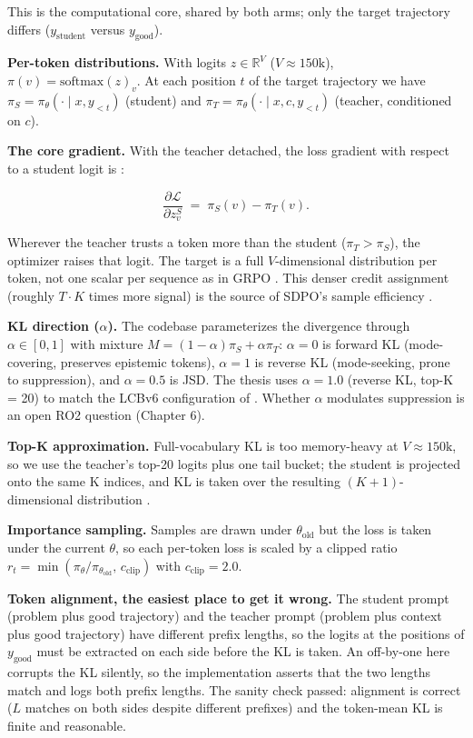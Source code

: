 \documentclass[12pt,a4paper]{report}
\begin{document}
This is the computational core, shared by both arms; only the target trajectory differs (\(y_{\text{student}}\) versus \(y_{\text{good}}\)).

\textbf{Per-token distributions.} With logits \(z \in \mathbb{R}^V\) (\(V \approx 150\text{k}\)), \(\pi(v) = \mathrm{softmax}(z)_v\). At each position \(t\) of the target trajectory we have \(\pi_S = \pi_\theta(\cdot\mid x, y_{<t})\) (student) and \(\pi_T = \pi_\theta(\cdot \mid x, c, y_{<t})\) (teacher, conditioned on \(c\)).

\textbf{The core gradient.} With the teacher detached, the loss gradient with respect to a student logit is \cite{r1}:

\[
\frac{\partial \mathcal{L}}{\partial z_v^{S}} \;=\; \pi_S(v) - \pi_T(v).
\]

Wherever the teacher trusts a token more than the student (\(\pi_T > \pi_S\)), the optimizer raises that logit. The target is a full \(V\)-dimensional distribution per token, not one scalar per sequence as in GRPO \cite{r8}. This denser credit assignment (roughly \(T \cdot K\) times more signal) is the source of SDPO's sample efficiency \cite{r1}.

\textbf{KL direction (\(\alpha\)).} The codebase \cite{r4} parameterizes the divergence through \(\alpha \in [0,1]\) with mixture \(M = (1-\alpha)\pi_S + \alpha\pi_T\): \(\alpha = 0\) is forward KL (mode-covering, preserves epistemic tokens), \(\alpha = 1\) is reverse KL (mode-seeking, prone to suppression), and \(\alpha = 0.5\) is JSD. The thesis uses \(\alpha = 1.0\) (reverse KL, top-K = 20) to match the LCBv6 configuration of \cite{r4}. Whether \(\alpha\) modulates suppression is an open RO2 question (Chapter 6).

\textbf{Top-K approximation.} Full-vocabulary KL is too memory-heavy at \(V \approx 150\text{k}\), so we use the teacher's top-20 logits plus one tail bucket; the student is projected onto the same K indices, and KL is taken over the resulting \((K{+}1)\)-dimensional distribution \cite{r1}.

\textbf{Importance sampling.} Samples are drawn under \(\theta_{\text{old}}\) but the loss is taken under the current \(\theta\), so each per-token loss is scaled by a clipped ratio \(r_t = \min(\pi_\theta/\pi_{\theta_\text{old}},\, c_{\text{clip}})\) with \(c_{\text{clip}} = 2.0\).

\textbf{Token alignment, the easiest place to get it wrong.} The student prompt (problem plus good trajectory) and the teacher prompt (problem plus context plus good trajectory) have different prefix lengths, so the logits at the positions of \(y_{\text{good}}\) must be extracted on each side before the KL is taken. An off-by-one here corrupts the KL silently, so the implementation asserts that the two lengths match and logs both prefix lengths. The sanity check passed: alignment is correct (\(L\) matches on both sides despite different prefixes) and the token-mean KL is finite and reasonable.
\end{document}

